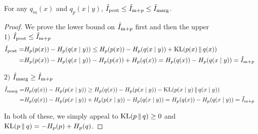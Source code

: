\renewcommand\thetheorem{4.9}
\begin{lemma}
    For any $q_m(x)$ and $q_p(x\mid y)$, $\hat{I}_{\text{post}}\leq\hat{I}_{\text{m}+p}\leq\hat{I}_{\text{marg}}$.
    \label{lemma:MIOrder}
  \end{lemma}
\begin{proof}
    We prove the lower bound on $\hat{I}_{\text{m}+p}$ first and then the upper\\
$1)$ $\hat{I}_{\text{post}}\leq\hat{I}_{\text{m}+p}$
    \begin{align*}
    \hat{I}_{\text{post}} =& H_p(p(x))-H_p(q(x\mid y))\leq H_p(p(x))-H_p(q(x\mid y))+\mathrm{KL}(p(x)\,\|\,q(x))\\
    =& H_p(p(x))-H_p(q(x\mid y))-H_p(p(x))+H_p(q(x)) = H_p(q(x))-H_p(q(x\mid y))=\hat{I}_{\text{m}+p}
    \end{align*}

$2)$ $\hat{I}_{\text{marg}}\geq\hat{I}_{\text{m}+p}$
    \begin{align*}
        \hat{I}_{\text{marg}} =& H_p(q(x))-H_p(p(x\mid y))\geq H_p(q(x))-H_p(p(x\mid y))-\mathrm{KL}(p(x\mid y)\,\|\,q(x\mid y))\\
        =& H_p(q(x))-H_p(p(x\mid y))+H_p(p(x\mid y))-H_p(q(x\mid y)) = H_p(q(x))-H_p(q(x\mid y))=\hat{I}_{\text{m}+p}
    \end{align*}

    In both of these, we simply appeal to $\mathrm{KL}(p\,\|\,q)\geq 0$ and $\mathrm{KL}(p\,\|\,q)=-H_p(p)+H_p(q)$.
\end{proof}

